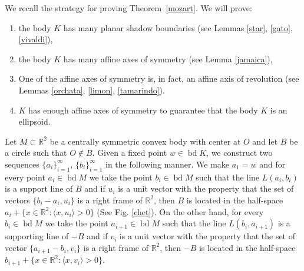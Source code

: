\documentclass[12pt]{amsart}
\newcommand{\bd}{\operatorname*{bd}}
\newcommand{\Rd}{\mathbb{R}^2}
\begin{document}
                   We recall the strategy for proving Theorem~\ref{mozart}.  We will prove: 
                   \begin{enumerate}
                   \item the body $K$ has many planar shadow boundaries (see Lemmas 
                   \ref{star}, \ref{gato}, \ref{vivaldi}),               
                    \item the body $K$ has many affine axes of symmetry (see Lemma \ref{jamaica}), 
                   \item One of the affine axes of symmetry is, in fact, an affine axis of 
                   revolution (see Lemmas \ref{orchata}, \ref{limon}, \ref{tamarindo}). 
                   \item$K$ has enough affine axes of symmetry to guarantee that the body $K$ is an ellipsoid.
                   \end{enumerate}
 
            Let $M\subset \Rd$ be a centrally symmetric convex body with center 
           at $O$ and let $B$ be a circle such that $O\notin B$. Given a fixed point 
           $w\in \bd K$, we construct two sequences $\{a_i\}_{i=1} ^\infty$, 
           $\{b_i\}_{i=1 }^\infty$ in the following manner. We make $a_1=w$ and 
           for every point $a_i\in \bd M$ we take the point $b_i\in \bd M$ such 
           that the line $L(a_i,b_i)$ is a support line of $B$ and if $u_i$ is a unit 
           vector with the property that the set of vectors $\{b_i-a_i,u_i\}$ is a 
           right frame of $\Rd$, then $B$ is located in the half-space 
           $a_i+\{x\in \Rd:  \langle x,u_i\rangle>0\}$ (See Fig. \ref{chet}). On the 
           other hand, for every $b_i\in \bd M$ we take the point 
           $a_{i+1}\in \bd M$ such that the line $L(b_i,a_{i+1})$ is a supporting 
           line of $-B$ and if $v_i$ is a unit vector with the property that the set of 
           vector $\{a_{i+1}-b_i,v_i\}$ is a right frame of $\Rd$, then $-B$ is 
           located in the half-space $b_{i+1}+\{x\in \Rd:  \langle x,v_i\rangle>0\}$.
\end{document}
